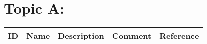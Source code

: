 
\section{Topic A:}

\begin{table}[H]\centering
\begin{tabular}{p{1cm}p{2cm}p{3cm}p{3cm}p{1cm}}
ID & Name & Description & Comment & Reference \\
\hline
\hline
\end{tabular}
\end{table}
